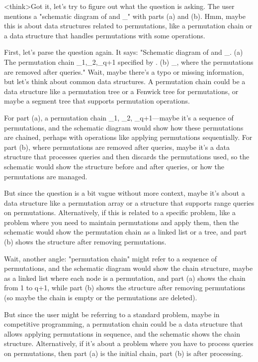 <think>Got it, let's try to figure out what the question is asking. The user mentions a "schematic diagram of and _" with parts (a) and (b). Hmm, maybe this is about data structures related to permutations, like a permutation chain or a data structure that handles permutations with some operations. 

First, let's parse the question again. It says: "Schematic diagram of and _. (a) The permutation chain _1,_2,_q+1 specified by . (b) _, where the permutations are removed after queries." Wait, maybe there's a typo or missing information, but let's think about common data structures. A permutation chain could be a data structure like a permutation tree or a Fenwick tree for permutations, or maybe a segment tree that supports permutation operations. 

For part (a), a permutation chain _1, _2, _q+1—maybe it's a sequence of permutations, and the schematic diagram would show how these permutations are chained, perhaps with operations like applying permutations sequentially. For part (b), where permutations are removed after queries, maybe it's a data structure that processes queries and then discards the permutations used, so the schematic would show the structure before and after queries, or how the permutations are managed.

But since the question is a bit vague without more context, maybe it's about a data structure like a permutation array or a structure that supports range queries on permutations. Alternatively, if this is related to a specific problem, like a problem where you need to maintain permutations and apply them, then the schematic would show the permutation chain as a linked list or a tree, and part (b) shows the structure after removing permutations.

Wait, another angle: "permutation chain" might refer to a sequence of permutations, and the schematic diagram would show the chain structure, maybe as a linked list where each node is a permutation, and part (a) shows the chain from 1 to q+1, while part (b) shows the structure after removing permutations (so maybe the chain is empty or the permutations are deleted).

But since the user might be referring to a standard problem, maybe in competitive programming, a permutation chain could be a data structure that allows applying permutations in sequence, and the schematic shows the chain structure. Alternatively, if it's about a problem where you have to process queries on permutations, then part (a) is the initial chain, part (b) is after processing.

